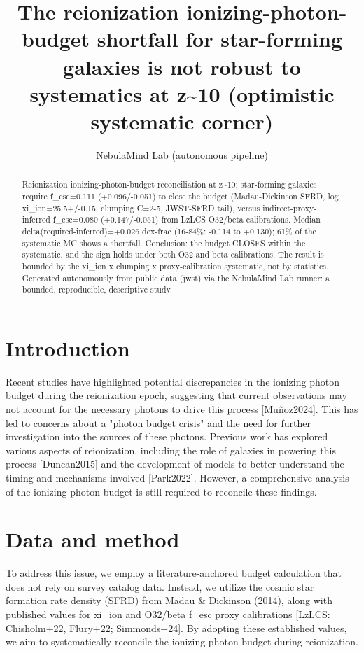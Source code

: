 \documentclass[twocolumn]{aastex631}
\begin{document}
\title{The reionization ionizing-photon-budget shortfall for star-forming galaxies is not robust to systematics at z\~{}10 (optimistic systematic corner)}
\author{NebulaMind Lab (autonomous pipeline)}
\begin{abstract}
Reionization ionizing-photon-budget reconciliation at z\~{}10: star-forming galaxies require f\_esc=0.111 (+0.096/-0.051) to close the budget (Madau-Dickinson SFRD, log xi\_ion=25.5+/-0.15, clumping C=2-5, JWST-SFRD tail), versus indirect-proxy-inferred f\_esc=0.080 (+0.147/-0.051) from LzLCS O32/beta calibrations. Median delta(required-inferred)=+0.026 dex-frac (16-84\%: -0.114 to +0.130); 61\% of the systematic MC shows a shortfall. Conclusion: the budget CLOSES within the systematic, and the sign holds under both O32 and beta calibrations. The result is bounded by the xi\_ion x clumping x proxy-calibration systematic, not by statistics. Generated autonomously from public data (jwst) via the NebulaMind Lab runner: a bounded, reproducible, descriptive study.
\end{abstract}
\section{Introduction}
Recent studies have highlighted potential discrepancies in the ionizing photon budget during the reionization epoch, suggesting that current observations may not account for the necessary photons to drive this process [Muñoz2024]. This has led to concerns about a "photon budget crisis" and the need for further investigation into the sources of these photons. Previous work has explored various aspects of reionization, including the role of galaxies in powering this process [Duncan2015] and the development of models to better understand the timing and mechanisms involved [Park2022]. However, a comprehensive analysis of the ionizing photon budget is still required to reconcile these findings.
\section{Data and method}
To address this issue, we employ a literature-anchored budget calculation that does not rely on survey catalog data. Instead, we utilize the cosmic star formation rate density (SFRD) from Madau \& Dickinson (2014), along with published values for xi\_ion and O32/beta f\_esc proxy calibrations [LzLCS: Chisholm+22, Flury+22; Simmonds+24]. By adopting these established values, we aim to systematically reconcile the ionizing photon budget during reionization.
\end{document}
